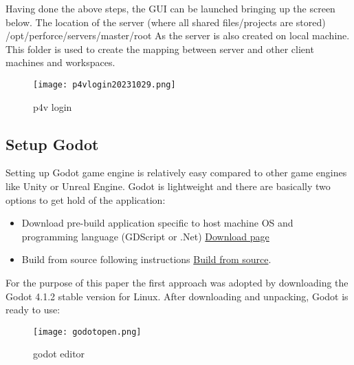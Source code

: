 Having done the above steps, the GUI can be launched bringing up the screen below. The location of the server (where
all shared files/projects are stored) \colorbox{blue!30}{/opt/perforce/servers/master/root} 
As the server is also created on local machine. This folder is used to create the mapping between server and other 
client machines and workspaces.
\begin{figure}[H]
    \centering
    \texttt{[image: p4vlogin20231029.png]}
      \caption{p4v login}
      \label{fig:p4v login}
\end{figure}

\subsection{Setup Godot}
Setting up Godot game engine is relatively easy compared to other game engines like Unity\textsuperscript{\texttrademark}
or Unreal Engine\textsuperscript{\texttrademark}. Godot is lightweight and there are basically two options to get hold
of the application:
\begin{itemize}
    \item Download pre-build application specific to host machine OS and programming language (GDScript or .Net)
    \href{https://godotengine.org/download/linux/}{\color{blue}Download page}
    \item Build from source following instructions 
    \href{https://docs.godotengine.org/en/stable/contributing/development/compiling/index.html}{\color{blue}Build from source}.
\end{itemize}
For the purpose of this paper the first approach was adopted by downloading the Godot 4.1.2 stable version for Linux.
After downloading and unpacking, Godot is ready to use:
\begin{figure}[H]
    \centering
    \texttt{[image: godotopen.png]}
      \caption{godot editor}
      \label{fig:godot}
\end{figure}

